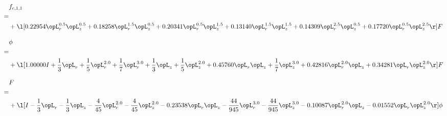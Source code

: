 \begin{alignat}{2} 
\label{eq:f_11_2} 
& f_{c,1,1} \nonumber \\ 
 = \\ 
& + \l[  0.22954 \opL_r^{0.5} \opL_z^{0.5} +  0.18258 \opL_r^{1.5} \opL_z^{0.5} +  0.20341 \opL_r^{0.5} \opL_z^{1.5} +  0.13140 \opL_r^{1.5} \opL_z^{1.5} +  0.14309 \opL_r^{2.5} \opL_z^{0.5} +  0.17720 \opL_r^{0.5} \opL_z^{2.5}  \r] F \nonumber \\ 
\end{alignat} 


\begin{alignat}{2} 
\label{eq:scalarFlux_1} 
& \phi \nonumber \\ 
 = \\ 
& + \l[  1.00000 I + \frac{1}{3} \opL_r + \frac{1}{5} \opL_r^{2.0} + \frac{1}{7} \opL_r^{3.0} + \frac{1}{3} \opL_z + \frac{1}{5} \opL_z^{2.0} +  0.45760 \opL_r \opL_z + \frac{1}{7} \opL_z^{3.0} +  0.42816 \opL_r^{2.0} \opL_z +  0.34281 \opL_r \opL_z^{2.0}  \r] F \nonumber \\ 
\end{alignat} 


\begin{alignat}{2} 
\label{eq:transport3D_0} 
& F \nonumber \\ 
 = \\ 
& + \l[ I - \frac{1}{3} \opL_r - \frac{1}{3} \opL_z - \frac{4}{45} \opL_r^{2.0} - \frac{4}{45} \opL_z^{2.0}   -0.23538 \opL_r \opL_z - \frac{44}{945} \opL_r^{3.0} - \frac{44}{945} \opL_z^{3.0}   -0.10087 \opL_r^{2.0} \opL_z   -0.01552 \opL_r \opL_z^{2.0}  \r] \phi \nonumber \\ 
\end{alignat} 


